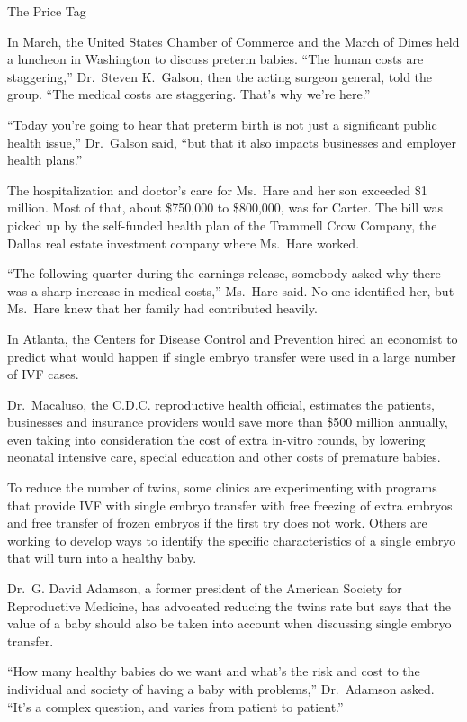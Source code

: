 ﻿\documentclass[12pt]{article}
\begin{document}
The Price Tag

In March, the United States Chamber of Commerce and the March of Dimes held a luncheon in Washington
to discuss preterm babies. ``The human costs are staggering,'' Dr.~Steven K.~Galson, then the acting
surgeon general, told the group. ``The medical costs are staggering. That's why we're here.''

``Today you're going to hear that preterm birth is not just a significant public health issue,''
Dr.~Galson said, ``but that it also impacts businesses and employer health plans.''

The hospitalization and doctor's care for Ms.~Hare and her son exceeded \$1 million. Most of that,
about \$750,000 to \$800,000, was for Carter. The bill was picked up by the self-funded health plan
of the Trammell Crow Company, the Dallas real estate investment company where Ms.~Hare worked.

``The following quarter during the earnings release, somebody asked why there was a sharp increase
in medical costs,'' Ms.~Hare said. No one identified her, but Ms.~Hare knew that her family had
contributed heavily.

In Atlanta, the Centers for Disease Control and Prevention hired an economist to predict what would
happen if single embryo transfer were used in a large number of IVF cases.

Dr.~Macaluso, the C.D.C. reproductive health official, estimates the patients, businesses and
insurance providers would save more than \$500 million annually, even taking into consideration the
cost of extra in-vitro rounds, by lowering neonatal intensive care, special education and other
costs of premature babies.

To reduce the number of twins, some clinics are experimenting with programs that provide IVF with
single embryo transfer with free freezing of extra embryos and free transfer of frozen embryos if
the first try does not work. Others are working to develop ways to identify the specific
characteristics of a single embryo that will turn into a healthy baby.

Dr.~G. David Adamson, a former president of the American Society for Reproductive Medicine, has
advocated reducing the twins rate but says that the value of a baby should also be taken into
account when discussing single embryo transfer.

``How many healthy babies do we want and what's the risk and cost to the individual and society of
having a baby with problems,'' Dr.~Adamson asked. ``It's a complex question, and varies from patient
to patient.''
\end{document}
